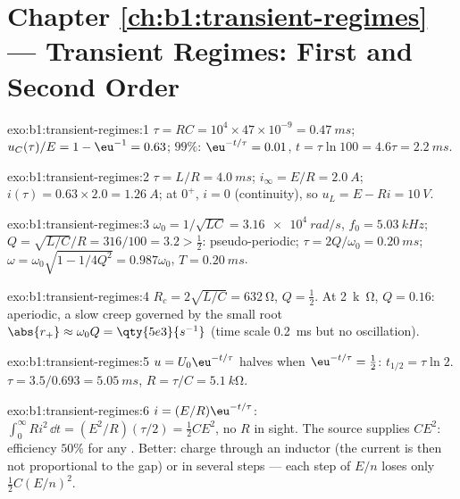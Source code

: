 \section*{Chapter \ref{ch:b1:transient-regimes} --- Transient Regimes: First and Second Order}

\begin{solution}{exo:b1:transient-regimes:1}
$\tau = RC = 10^4 \times 47\times10^{-9} = \qty{0.47}{ms}$; $u_C(\tau)/E
= 1 - \eu^{-1} = 0.63$; $99\%$: $\eu^{-t/\tau} = 0.01$, $t = \tau\ln 100
= 4.6\tau = \qty{2.2}{ms}$.
\end{solution}

\begin{solution}{exo:b1:transient-regimes:2}
$\tau = L/R = \qty{4.0}{ms}$; $i_\infty = E/R = \qty{2.0}{A}$; $i(\tau) =
0.63 \times 2.0 = \qty{1.26}{A}$; at $0^+$, $i = 0$ (continuity), so
$u_L = E - Ri = \qty{10}{V}$.
\end{solution}

\begin{solution}{exo:b1:transient-regimes:3}
$\omega_0 = 1/\sqrt{LC} = \qty{3.16e4}{rad/s}$, $f_0 = \qty{5.03}{kHz}$;
$Q = \sqrt{L/C}/R = 316/100 = 3.2 > \tfrac12$: pseudo-periodic;
$\tau = 2Q/\omega_0 = \qty{0.20}{ms}$; $\omega = \omega_0\sqrt{1 - 1/4Q^2}
= 0.987\omega_0$, $T = \qty{0.20}{ms}$.
\end{solution}

\begin{solution}{exo:b1:transient-regimes:4}
$R_c = 2\sqrt{L/C} = \qty{632}{\ohm}$, $Q = \tfrac12$. At \qty{2}{k\ohm},
$Q = 0.16$: aperiodic, a slow creep governed by the small root
$\abs{r_+} \approx \omega_0 Q = \qty{5e3}{s^{-1}}$ (time scale
\qty{0.2}{ms} but no oscillation).
\end{solution}

\begin{solution}{exo:b1:transient-regimes:5}
$u = U_0\eu^{-t/\tau}$ halves when $\eu^{-t/\tau} = \tfrac12$: $t_{1/2}
= \tau\ln 2$. $\tau = 3.5/0.693 = \qty{5.05}{ms}$, $R = \tau/C =
\qty{5.1}{k\ohm}$.
\end{solution}

\begin{solution}{exo:b1:transient-regimes:6}
$i = (E/R)\eu^{-t/\tau}$: $\int_0^\infty Ri^2\,\dd t = (E^2/R)(\tau/2) =
\tfrac12 CE^2$, no $R$ in sight. The source supplies $CE^2$: efficiency
$50\%$ for any . Better: charge through an inductor (the
current is then not proportional to the  gap) or in several
 steps --- each step of $E/n$ loses only $\tfrac12 C(E/n)^2$.
\end{solution}

